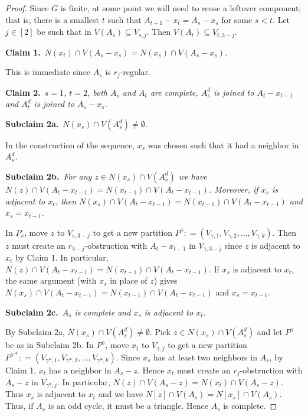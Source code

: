 \documentclass[12pt]{amsart}
\theoremstyle{plain}
\theoremstyle{definition}
\theoremstyle{remark}
\newcommand{\irange}[1]{\left[#1\right]}
\newcommand{\parens}[1]{\left( #1 \right)}
\newcommand{\DefinedAs}{\mathrel{\mathop:}=}
\newcommand{\mov}[2]{#1^{#2}}
\newcommand{\claim}[2]{{\bf Claim #1.}~{\it #2}~~}
\newcommand{\subclaim}[2]{{\bf Subclaim #1.}~{\it #2}~~}
\begin{document}
\begin{proof}
			Since $G$ is finite, at some point we will need to reuse a leftover component; that is, 
			there is a smallest $t$ such that $A_{t + 1} - x_t = A_s - x_s$ for some $s <
			t$.  Let $j \in \irange{2}$ be such that in $V(A_s) \subseteq V_{s, j}$. 
			Then $V(A_t) \subseteq V_{t, 3-j}$.  

			\claim{1}{$N(x_t) \cap V(A_s - x_s) = N(x_s) \cap V(A_s - x_s)$.}  

			This is immediate since $A_s$ is $r_j$-regular.

			\claim{2}{$s = 1$, $t = 2$, both $A_s$ and $A_t$ are complete,
			$\mov{A_s}{d}$ is joined to $A_t - x_{t-1}$ and $\mov{A_t}{d}$ is joined to $A_s - x_s$.}

			\subclaim{2a}{$N(x_s) \cap V(\mov{A_s}{d}) \neq \emptyset$.}
			
			In the construction of the sequence, $x_s$ was chosen such that it had a neighbor in $\mov{A_s}{d}$.

			\subclaim{2b}{For any $z \in N(x_s) \cap V(\mov{A_s}{d})$ we have $N(z) \cap V(A_t - x_{t-1}) = N(x_{t-1}) \cap V(A_t - x_{t-1})$.  Moreover, if $x_s$ is adjacent to $x_t$, then $N(x_s) \cap V(A_t - x_{t-1}) = N(x_{t-1}) \cap V(A_t - x_{t-1})$ and $x_s = x_{t-1}$.}

			In $P_s$, move $z$ to $V_{s, 3-j}$ to get a new partition $P^\gamma \DefinedAs \parens{V_{\gamma,
			1}, V_{\gamma, 2}, \ldots, V_{\gamma, k}}$. Then $z$ must create an
			$r_{3-j}$-obstruction with $A_t - x_{t-1}$ in $V_{\gamma, 3-j}$ since
			$z$ is adjacent to $x_t$ by Claim 1.  
			In particular, $N(z) \cap V(A_t - x_{t-1}) = N(x_{t-1}) \cap V(A_t -
			x_{t-1})$.  If $x_s$ is adjacent to $x_t$, the same argument (with $x_s$ in place of $z$) gives $N(x_s) \cap V(A_t - x_{t-1}) = N(x_{t-1}) \cap V(A_t - x_{t-1})$ and $x_s = x_{t-1}$.

         \subclaim{2c}{$A_s$ is complete and $x_s$	is adjacent to $x_t$.}

			By Subclaim 2a, $N(x_s) \cap V(\mov{A_s}{d}) \neq \emptyset$. Pick $z \in N(x_s) \cap V(\mov{A_s}{d})$ and let $P^\gamma$ be as in Subclaim 2b. In $P^\gamma$, move    $x_t$ to $V_{\gamma, j}$ to get a new partition $P^{\gamma*} \DefinedAs \parens{V_{\gamma*, 1},
			V_{\gamma*, 2}, \ldots, V_{\gamma*, k}}$. Since $x_s$ has at least two neighbors in $A_s$, by Claim 1, $x_t$ has a neighbor in $A_s - z$.  Hence $x_t$ must create an
			$r_{j}$-obstruction with $A_s - z$ in $V_{\gamma*, j}$.  In
			particular, $N(z) \cap V(A_s - z) = N(x_t) \cap V(A_s - z)$.  Thus $x_s$
			is adjacent to $x_t$ and we have $N[z] \cap V(A_s) = N[x_s] \cap
			V(A_s)$.  Thus, if $A_s$ is an odd cycle, it must be a triangle.  
			Hence $A_s$ is complete.  


\end{proof}
\end{document}
